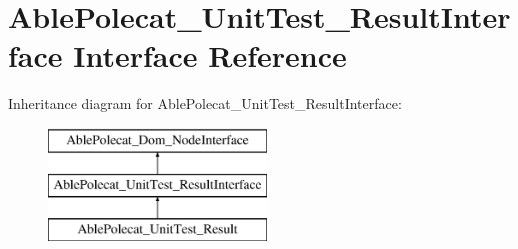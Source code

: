 \hypertarget{interface_able_polecat___unit_test___result_interface}{}\section{Able\+Polecat\+\_\+\+Unit\+Test\+\_\+\+Result\+Interface Interface Reference}
\label{interface_able_polecat___unit_test___result_interface}
Inheritance diagram for Able\+Polecat\+\_\+\+Unit\+Test\+\_\+\+Result\+Interface\+:\begin{figure}[H]
\begin{center}
\leavevmode
\includegraphics[height=3.000000cm]{interface_able_polecat___unit_test___result_interface}
\end{center}
\end{figure}
